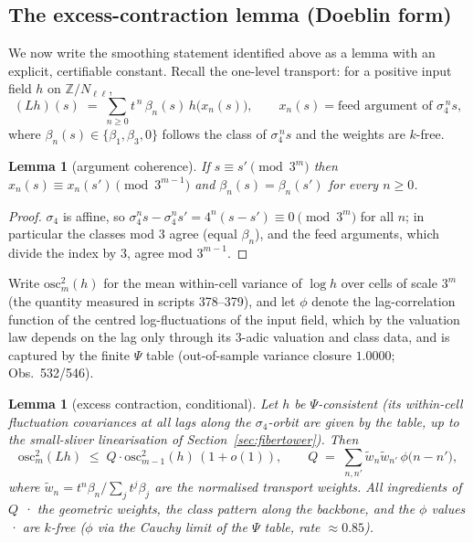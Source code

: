 \documentclass[11pt]{article}
\newtheorem{lemma}[theorem]{Lemma}
\theoremstyle{definition}
\newcommand{\Z}{\mathbb{Z}}
\begin{document}
\subsection{The excess-contraction lemma (Doeblin form)}
\label{sec:doeblin}

We now write the smoothing statement identified above as a lemma with an
explicit, certifiable constant. Recall the one-level transport: for a
positive input field $h$ on $\Z/N_{\ell\ell}$,
\[
(Lh)(s) \;=\; \sum_{n \ge 0} t^{\,n}\, \beta_n(s)\, h\big(x_n(s)\big),
\qquad
x_n(s) = \text{feed argument of } \sigma_4^{\,n} s,
\]
where $\beta_n(s) \in \{\beta_1, \beta_3, 0\}$ follows the class of
$\sigma_4^{\,n} s$ and the weights are $k$-free.

\begin{lemma}[argument coherence]\label{lem:coherence}
If $s \equiv s' \pmod{3^m}$ then $x_n(s) \equiv x_n(s') \pmod{3^{m-1}}$ and
$\beta_n(s) = \beta_n(s')$ for \emph{every} $n \ge 0$.
\end{lemma}

\begin{proof}
$\sigma_4$ is affine, so $\sigma_4^n s - \sigma_4^n s' = 4^n(s-s') \equiv 0
\pmod{3^m}$ for all $n$; in particular the classes mod $3$ agree (equal
$\beta_n$), and the feed arguments, which divide the index by $3$, agree mod
$3^{m-1}$.
\end{proof}

Write $\mathrm{osc}_m^2(h)$ for the mean within-cell variance of $\log h$
over cells of scale $3^m$ (the quantity measured in scripts 378--379), and
let $\phi$ denote the lag-correlation function of the centred
log-fluctuations of the input field, which by the valuation law depends on
the lag only through its $3$-adic valuation and class data, and is captured
by the finite $\Psi$ table (out-of-sample variance closure $1.0000$;
Obs.~532/546).

\begin{lemma}[excess contraction, conditional]\label{lem:doeblin}
Let $h$ be $\Psi$-consistent (its within-cell fluctuation covariances at all
lags along the $\sigma_4$-orbit are given by the table, up to the small-sliver
linearisation of Section~\ref{sec:fibertower}). Then
\[
\mathrm{osc}_{m}^2(Lh) \;\le\; Q \cdot \mathrm{osc}_{m-1}^2(h) \,(1 + o(1)),
\qquad
Q \;=\; \sum_{n, n'} \tilde w_n \tilde w_{n'}\, \phi\big(n - n'\big),
\]
where $\tilde w_n = t^n \beta_n / \sum_j t^j \beta_j$ are the normalised
transport weights. All ingredients of $Q$ · the geometric weights, the class
pattern along the backbone, and the $\phi$ values · are $k$-free ($\phi$ via
the Cauchy limit of the $\Psi$ table, rate $\approx 0.85$).
\end{lemma}
\end{document}
